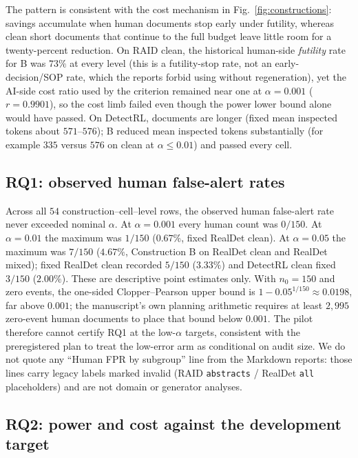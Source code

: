 \documentclass[pdflatex,sn-mathphys-num]{sn-jnl}
\begin{document}
The pattern is consistent with the cost mechanism in Fig.~\ref{fig:constructions}: savings accumulate when human documents stop early under futility, whereas clean short documents that continue to the full budget leave little room for a twenty-percent reduction. On RAID clean, the historical human-side \emph{futility} rate for B was \(73\%\) at every level (this is a futility-stop rate, not an early-decision/SOP rate, which the reports forbid using without regeneration), yet the AI-side cost ratio used by the criterion remained near one at \(\alpha=0.001\) (\(r=0.9901\)), so the cost limb failed even though the power lower bound alone would have passed. On DetectRL, documents are longer (fixed mean inspected tokens about \(571\)--\(576\)); B reduced mean inspected tokens substantially (for example \(335\) versus \(576\) on clean at \(\alpha\le 0.01\)) and passed every cell.

\subsection{RQ1: observed human false-alert rates}

Across all \(54\) construction--cell--level rows, the observed human false-alert rate never exceeded nominal \(\alpha\). At \(\alpha=0.001\) every human count was \(0/150\). At \(\alpha=0.01\) the maximum was \(1/150\) (\(0.67\%\), fixed RealDet clean). At \(\alpha=0.05\) the maximum was \(7/150\) (\(4.67\%\), Construction B on RealDet clean and RealDet mixed); fixed RealDet clean recorded \(5/150\) (\(3.33\%\)) and DetectRL clean fixed \(3/150\) (\(2.00\%\)). These are descriptive point estimates only. With \(n_0=150\) and zero events, the one-sided Clopper--Pearson upper bound is \(1-0.05^{1/150}\approx 0.0198\), far above \(0.001\); the manuscript's own planning arithmetic requires at least \(2{,}995\) zero-event human documents to place that bound below \(0.001\). The pilot therefore cannot certify RQ1 at the low-\(\alpha\) targets, consistent with the preregistered plan to treat the low-error arm as conditional on audit size. We do not quote any ``Human FPR by subgroup'' line from the Markdown reports: those lines carry legacy labels marked invalid (RAID \texttt{abstracts} / RealDet \texttt{all} placeholders) and are not domain or generator analyses.

\subsection{RQ2: power and cost against the development target}
\end{document}
